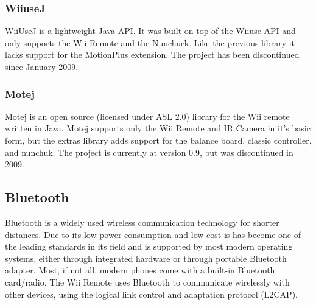 \subsubsection{WiiuseJ}
WiiUseJ is a lightweight Java API. It was built on top of the Wiiuse API and only supports the Wii Remote and the Nunchuck. Like the previous library it lacks support for the MotionPlus extension. The project has been discontinued since January 2009. \cite{Wiiusej}

\subsubsection{Motej}
Motej is an open source (licensed under ASL 2.0) library for the Wii remote written in Java. Motej supports only the Wii Remote and IR Camera in it's basic form, but the extras library adds support for the balance board, classic controller, and nunchuk. The project is currently at version 0.9, but was discontinued in 2009. \cite{Motej}

\subsection{Bluetooth}
Bluetooth is a widely used wireless communication technology for shorter distances. Due to its low power consumption and low cost is has become one of the leading standards in its field and is supported by most modern operating systems, either through integrated hardware or through portable Bluetooth adapter. Most, if not all, modern phones come with a built-in Bluetooth card/radio. %
The Wii Remote uses Bluetooth to communicate wirelessly with other devices, using the logical link control and adaptation protocol (L2CAP). 

